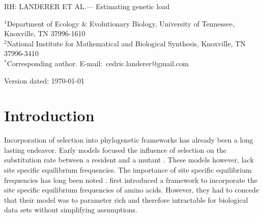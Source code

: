 \documentclass[12pt]{article}
\begin{document}
\doublespacing
\linenumbers

\newcommand{\LLik}{\ensuremath{\text{\emph{L}}}\xspace}
\newcommand{\selac}{\emph{SelAC}\xspace}
\newcommand{\phydms}{\emph{phydms}\xspace}


\newcommand{\beginsupplement}{%
  \setcounter{section}{19} %
  \setcounter{page}{1}
  \renewcommand{\thepage}{S\arabic{page}} %

  \setcounter{table}{0}
  \renewcommand{\thetable}{S\arabic{table}}%
  \setcounter{figure}{0}
  \renewcommand{\thefigure}{S\arabic{figure}}%
}


\noindent RH: LANDERER ET AL.--- Estimating genetic load
\bigskip
\medskip
\begin{center}

\bigskip


\end{center}

\vfill

{\small
\noindent$^{1}$Department of Ecology \& Evolutionary Biology, University of Tennessee, Knoxville, TN 37996-1610\\
\noindent$^{2}$National Institute for Mathematical and Biological Synthesis, Knoxville, TN 37996-3410\\
\noindent$^{*}$Corresponding author. E-mail:~cedric.landerer@gmail.com
}

\vfill
\centerline{Version dated: \today}
\vfill
\newpage




\section*{Introduction}

Incorporation of selection into phylogenetic frameworks has already been a long lasting endeavor.
Early models focused the influence of selection on the substitution rate between a resident and a mutant \citep{GoldmanAndYang1994, MuseAndGaut1994, thorne1996}.
These models however, lack site specific equilibrium frequencies.
The importance of site specific equilibrium frequencies has long been noted \citep{felsenstein1981, gojobori1983}.
\citet{HalpernAndBruno1998} first introduced a framework to incorporate the site specific equilibrium frequencies of amino acids.
However, they had to concede that their model was to parameter rich and therefore intractable for biological data sets without simplifying assumptions.
\end{document}
